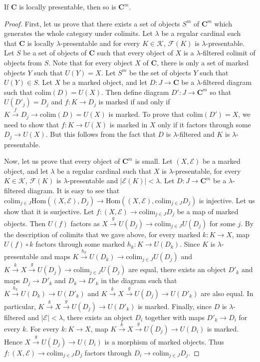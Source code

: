 \documentclass[reqno]{amsart}
\theoremstyle{definition}
\theoremstyle{remark}
\newcommand{\cat}[1]{\mathbf{#1}}
\newcommand{\C}{\cat{C}}
\newcommand{\Hom}{\mathrm{Hom}}
\newcommand{\colim}{\mathrm{colim}}
\numberwithin{figure}{section}
\begin{document}
\begin{prop}
If $\C$ is locally presentable, then so is $\C^m$.
\end{prop}
\begin{proof}
First, let us prove that there exists a set of objects $S^m$ of $\C^m$ which generates the whole category under colimits.
Let $\lambda$ be a regular cardinal such that $\C$ is locally $\lambda$-presentable and for every $K \in \mathcal{K}$, $\mathcal{F}(K)$ is $\lambda$-presentable.
Let $S$ be a set of objects of $\C$ such that every object of $X$ is a $\lambda$-filtered colimit of objects from $S$.
Note that for every object $X$ of $\C$, there is only a set of marked objects $Y$ such that $U(Y) = X$.
Let $S^m$ be the set of objects $Y$ such that $U(Y) \in S$.
Let $X$ be a marked object, and let $D : J \to \C$ be a $\lambda$-filtered diagram such that $\colim(D) = U(X)$.
Then define diagram $D' : J \to \C^m$ so that $U(D'_j) = D_j$ and $f : K \to D_j$ is marked if and only if $K \xrightarrow{f} D_j \to \colim(D) = U(X)$ is marked.
To prove that $\colim(D') = X$, we need to show that $f : K \to U(X)$ is marked in $X$ only if it factors through some $D_j \to U(X)$.
But this follows from the fact that $D$ is $\lambda$-filtered and $K$ is $\lambda$-presentable.

Now, let us prove that every object of $\C^m$ is small.
Let $(X,\mathcal{E})$ be a marked object, and let $\lambda$ be a regular cardinal such that
$X$ is $\lambda$-presentable, for every $K \in \mathcal{K}$, $\mathcal{F}(K)$ is $\lambda$-presentable and $|\mathcal{E}(K)| < \lambda$.
Let $D : J \to \C^m$ be a $\lambda$-filtered diagram.
It is easy to see that $\colim_{j \in J} \Hom((X,\mathcal{E}), D_j) \to \Hom((X,\mathcal{E}), \colim_{j \in J} D_j)$ is injective.
Let us show that it is surjective.
Let $f : (X,\mathcal{E}) \to \colim_{j \in J} D_j$ be a map of marked objects.
Then $U(f)$ factors as $X \xrightarrow{g} U(D_j) \to \colim_{j \in J} U(D_j)$ for some $j$.
By the description of colimits that we gave above, for every marked $k : K \to X$, map $U(f) \circ k$ factors through some marked $h_k : K \to U(D_k)$.
Since $K$ is $\lambda$-presentable and maps $K \xrightarrow{h_k} U(D_k) \to \colim_{j \in J} U(D_j)$
and $K \xrightarrow{k} X \xrightarrow{g} U(D_j) \to \colim_{j \in J} U(D_j)$ are equal,
there exists an object $D'_k$ and maps $D_j \to D'_k$ and $D_k \to D'_k$ in the diagram such that
$K \xrightarrow{h_k} U(D_k) \to U(D'_k)$ and $K \xrightarrow{k} X \xrightarrow{g} U(D_j) \to U(D'_k)$ are also equal.
In particular, $K \xrightarrow{k} X \xrightarrow{g} U(D_j) \to U(D'_k)$ is marked.
Finally, since $D$ is $\lambda$-filtered and $|\mathcal{E}| < \lambda$, there exists an object $D_i$ together with maps $D'_k \to D_i$ for every $k$.
For every $k : K \to X$, map $K \xrightarrow{k} X \xrightarrow{g} U(D_j) \to U(D_i)$ is marked.
Hence $X \xrightarrow{g} U(D_j) \to U(D_i)$ is a morphism of marked objects.
Thus $f : (X,\mathcal{E}) \to \colim_{j \in J} D_j$ factors through $D_i \to \colim_{j \in J} D_j$.
\end{proof}
\end{document}
